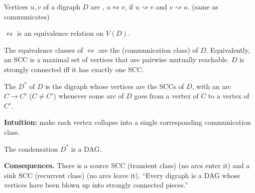 \documentclass[8pt,a4paper,landscape]{extarticle}
\begin{document}
\begin{cscolumns}
\begin{definition}
Vertices $u,v$ of a digraph $D$ are , $u\leftrightsquigarrow v$, if $u\rightsquigarrow v$ and $v\rightsquigarrow u$. (same as communicates)
\end{definition}
\begin{theorem}[Lemma]
$\leftrightsquigarrow$ is an equivalence relation on $V(D)$.
\end{theorem}
\begin{definition}
The equivalence classes of $\leftrightsquigarrow$ are the  (communication class) of $D$. Equivalently, an SCC is a maximal set of vertices that are pairwise mutually reachable. $D$ is strongly connected iff it has exactly one SCC.
\end{definition}
\begin{definition}[Condensation]
The  $D^*$ of $D$ is the digraph whose vertices are the SCCs of $D$, with an arc $C\to C'$ ($C\ne C'$) whenever some arc of $D$ goes from a vertex of $C$ to a vertex of $C'$.
\end{definition}
\noindent\textbf{Intuition:} make each vertex collapse into a single corresponding communication class.
\begin{theorem}
The condensation $D^*$ is a DAG.
\end{theorem}
\noindent\textbf{Consequences.} There is a source SCC (transient class) (no arcs enter it) and a sink SCC (recurrent class) (no arcs leave it). ``Every digraph is a DAG whose vertices have been blown up into strongly connected pieces.''

\end{cscolumns}
\end{document}
